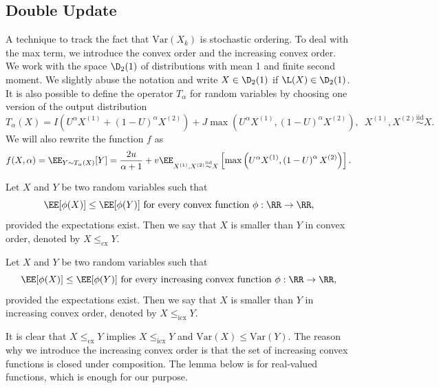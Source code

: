 \subsection{Double Update}

A technique to track the fact that $\text{Var}(X_k)$ is stochastic ordering. To deal with the max term, we introduce the convex order and the increasing convex order. We work with the space $\D_2(1)$ of distributions with mean 1 and finite second moment. We slightly abuse the notation and write $X\in\D_2(1)$ if $\L(X)\in\D_2(1)$. It is also possible to define the operator $T_\alpha$ for random variables by choosing one version of the output distribution
\begin{equation}
  T_\alpha(X) = I\left(U^\alpha X^{(1)} + \left(1-U\right)^\alpha X^{(2)}\right) + J\max\left(U^\alpha X^{(1)}, \left(1-U\right)^\alpha X^{(2)}\right),\,\,\, X^{(1)}, X^{(2)} \stackrel{\text{iid}}{\sim} X.
\end{equation}
We will also rewrite the function $f$ as
\begin{equation}
  f(X, \alpha) = \EE_{Y\sim T_\alpha(X)}[Y]=\dfrac{2u}{\alpha+1} + v\EE_{X^{(1)}, X^{(2)} \stackrel{\text{iid}}{\sim} X}\left[\max\left(U^\alpha X^{(1)}, \left(1-U\right)^\alpha X^{(2)}\right)\right].
\end{equation}

\begin{definition}
  Let $X$ and $Y$ be two random variables such that
  $$\EE[\phi(X)]\le \EE[\phi(Y)] \text{ for every convex function } \phi:\RR\to\RR,$$
  provided the expectations exist. Then we say that $X$ is smaller than $Y$ in convex order, denoted by $X\le_{\text{cx}} Y$.
\end{definition}

\begin{definition}
  Let $X$ and $Y$ be two random variables such that
  $$\EE[\phi(X)]\le \EE[\phi(Y)] \text{ for every increasing convex function } \phi:\RR\to\RR,$$
  provided the expectations exist. Then we say that $X$ is smaller than $Y$ in increasing convex order, denoted by $X\le_{\text{icx}} Y$.
\end{definition}

It is clear that $X\le_{\text{cx}} Y$ implies $X\le_{\text{icx}} Y$ and $\text{Var}(X)\le \text{Var}(Y)$. The reason why we introduce the increasing convex order is that the set of increasing convex functions is closed under composition. The lemma below is for real-valued functions, which is enough for our purpose.


